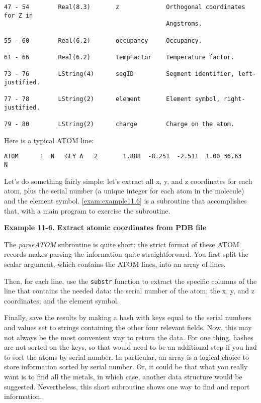 \begin{lstlisting}
47 - 54        Real(8.3)       z             Orthogonal coordinates for Z in       
                                             Angstroms.                            

55 - 60        Real(6.2)       occupancy     Occupancy.                            

61 - 66        Real(6.2)       tempFactor    Temperature factor.                   

73 - 76        LString(4)      segID         Segment identifier, left-justified.   

77 - 78        LString(2)      element       Element symbol, right-justified.      

79 - 80        LString(2)      charge        Charge on the atom.       
\end{lstlisting}

Here is a typical ATOM line:

\begin{lstlisting}
ATOM      1  N   GLY A   2       1.888  -8.251  -2.511  1.00 36.63           N  
\end{lstlisting}

Let's do something fairly simple: let's extract all x, y, and z coordinates for each atom, plus the serial number (a unique integer for each atom in the molecule) and the element symbol. \autoref{exam:example11.6} is a subroutine that accomplishes that, with a main program to exercise the subroutine. 

\textbf{Example 11-6. Extract atomic coordinates from PDB file}


The \textit{parseATOM} subroutine is quite short: the strict format of these ATOM records makes parsing the information quite straightforward. You first split the scalar argument, which contains the ATOM lines, into an array of lines.

Then, for each line, use the \verb|substr| function to extract the specific columns of the line that contains the needed data: the serial number of the atom; the x, y, and z coordinates; and the element symbol.

Finally, save the results by making a hash with keys equal to the serial numbers and values set to strings containing the other four relevant fields. Now, this may not always be the most convenient way to return the data. For one thing, hashes are not sorted on the keys, so that would need to be an additional step if you had to sort the atoms by serial number. In particular, an array is a logical choice to store information sorted by serial number. Or, it could be that what you really want is to find all the metals, in which case, another data structure would be suggested. Nevertheless, this short subroutine shows one way to find and report information.


